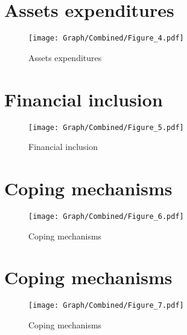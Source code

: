 \documentclass[10pt,a4paper]{article}
\begin{document}
\section{Assets expenditures}
\begin{table}[H]\centering

\end{table}
\begin{figure}[H]\centering
\texttt{[image: Graph/Combined/Figure\_4.pdf]}
\caption{Assets expenditures} \label{fig:Fig_4}
\end{figure}
\begin{table}[H]\centering

\end{table}
\pagebreak
\section{Financial inclusion}
\begin{table}[H]\centering

\end{table}
\begin{figure}[H]\centering
\texttt{[image: Graph/Combined/Figure\_5.pdf]}
\caption{Financial inclusion} \label{fig:Fig_5}
\end{figure}
\begin{table}[H]\centering

\end{table}
\pagebreak
\section{Coping mechanisms}
\begin{table}[H]\centering

\end{table}
\begin{figure}[H]\centering
\texttt{[image: Graph/Combined/Figure\_6.pdf]}
\caption{Coping mechanisms} \label{fig:Fig_6}
\end{figure}
\begin{table}[H]\centering

\end{table}
\pagebreak
\section{Coping mechanisms}
\begin{table}[H]\centering

\end{table}
\begin{figure}[H]\centering
\texttt{[image: Graph/Combined/Figure\_7.pdf]}
\caption{Coping mechanisms} \label{fig:Fig_7}
\end{figure}
\begin{table}[H]\centering

\end{table}
\pagebreak
\end{document}
